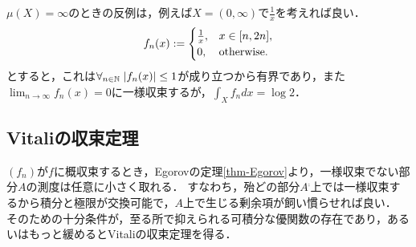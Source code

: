\documentclass[uplatex, dvipdfmx]{jsreport}
\begin{document}
\begin{remark}[測度が有限でない場合の反例]
    $\mu(X)=\infty$のときの反例は，例えば$X=(0,\infty)$で$\frac{1}{x}$を考えれば良い．
    \[f_n(x):=\begin{cases}
        \frac{1}{x},&x\in[n,2n],\\
        0,&\mathrm{otherwise}.
    \end{cases}\]とすると，これは$\forall_{n\in\mathbb{N}}\;\lvert f_n(x)\rvert\le 1$が成り立つから有界であり，また$\lim_{n\to\infty}f_n(x)=0$に一様収束するが，$\int_Xf_ndx=\log 2$．
\end{remark}

\subsection{Vitaliの収束定理}

\begin{tcolorbox}[colframe=ForestGreen, colback=ForestGreen!10!white,breakable,colbacktitle=ForestGreen!40!white,coltitle=black,fonttitle=\bfseries\sffamily,
title=Lebesgueの優収束定理の描像と精緻化]
    $(f_n)$が$f$に概収束するとき，Egorovの定理\ref{thm-Egorov}より，一様収束でない部分$A$の測度は任意に小さく取れる．
    すなわち，殆どの部分$A^\comp$上では一様収束するから積分と極限が交換可能で，$A$上で生じる剰余項が飼い慣らせれば良い．
    そのための十分条件が，至る所で抑えられる可積分な優関数の存在であり，あるいはもっと緩めるとVitaliの収束定理を得る．
\end{tcolorbox}
\end{document}
